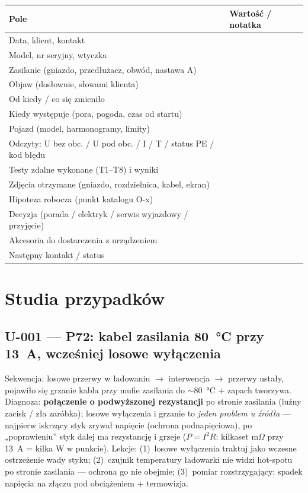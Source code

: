 \documentclass[11pt]{article}
\newcommand{\key}[1]{\textbf{\color{navy}#1}}
\begin{document}
{\small
\begin{tabularx}{\textwidth}{@{}p{4.6cm}Y@{}}
\toprule
\textbf{\sffamily Pole} & \textbf{\sffamily Wartość / notatka}\\
\midrule
Data, klient, kontakt & \\
Model, nr seryjny, wtyczka & \\
Zasilanie (gniazdo, przedłużacz, obwód, nastawa A) & \\
Objaw (dosłownie, słowami klienta) & \\
Od kiedy / co się zmieniło & \\
Kiedy występuje (pora, pogoda, czas od startu) & \\
Pojazd (model, harmonogramy, limity) & \\
Odczyty: U bez obc. / U pod obc. / I / T / status PE / kod błędu & \\
Testy zdalne wykonane (T1--T8) i wyniki & \\
Zdjęcia otrzymane (gniazdo, rozdzielnica, kabel, ekran) & \\
Hipoteza robocza (punkt katalogu O-x) & \\
Decyzja (porada / elektryk / serwis wyjazdowy / przyjęcie) & \\
Akcesoria do dostarczenia z urządzeniem & \\
Następny kontakt / status & \\
\bottomrule
\end{tabularx}
}

\section{Studia przypadków}\label{sec:przypadki}
\subsection{U-001 — P72: kabel zasilania 80~°C przy 13~A, wcześniej losowe wyłączenia}
Sekwencja: losowe przerwy w ładowaniu $\rightarrow$ interwencja $\rightarrow$ przerwy ustały, pojawiło się grzanie kabla przy mufie zasilania do $\sim$80~°C + zapach tworzywa. Diagnoza: \key{połączenie o podwyższonej rezystancji} po stronie zasilania (luźny zacisk / zła zaróbka); losowe wyłączenia i grzanie to \emph{jeden problem u źródła} — najpierw iskrzący styk zrywał napięcie (ochrona podnapięciowa), po „poprawieniu'' styk dalej ma rezystancję i grzeje ($P=I^2R$: kilkaset m$\Omega$ przy 13~A = kilka W w punkcie). Lekcje: (1)~losowe wyłączenia traktuj jako wczesne ostrzeżenie wady styku; (2)~czujnik temperatury ładowarki nie widzi hot-spotu po stronie zasilania — ochrona go nie obejmie; (3)~pomiar rozstrzygający: spadek napięcia na złączu pod obciążeniem + termowizja.
\end{document}
